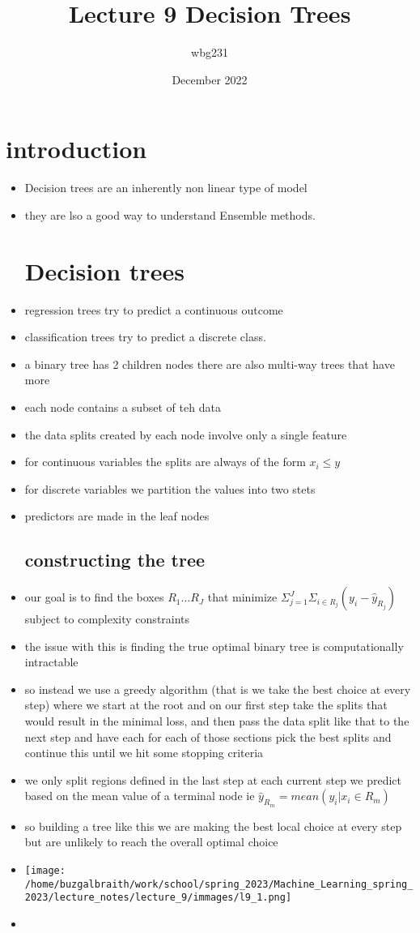 \documentclass{article}
\title{Lecture 9 Decision  Trees}
\author{wbg231 }
\date{December 2022}
\begin{document}
\maketitle

\section*{introduction}
\begin{itemize}
\item Decision trees are an inherently non linear type of model
\item they are lso a good way to understand Ensemble  methods. 
\section*{Decision trees}
\item regression trees try to predict a continuous outcome 
\item classification trees try to predict a discrete class.
\item a binary tree has 2 children nodes there are also multi-way trees that have more 
\item each node contains a subset of teh data 
\item the data splits created by each node involve only a single feature 
\item for continuous variables the splits are always of the form $x_{i}\leq y$
\item for discrete variables we partition the values into two stets 
\item predictors are made in the leaf nodes 
\subsection*{constructing the tree }
\item our goal is to find the boxes $R_1\dots R_J$ that minimize
 $\Sigma_{j=1}^{J}\Sigma_{i\in R_{j}}(y_i-\hat{y}_{R_{j}})$ subject to 
 complexity constraints 
\item the issue with this is finding the true optimal binary tree is computationally
intractable
\item so instead we use a greedy algorithm  (that is we take the best choice at every step)
where we start at the root and on our first step take the splits that would 
result in the minimal loss, and then pass the data split like that to the next
step and have each for each of those sections pick the best splits
and continue this until we hit some stopping criteria
\item we only split regions defined in the last step at each current step 
we predict based on the mean value of a terminal node ie $\hat{y}_{R_{m}}=mean(y_i|x_i\in R_{m})$ 
\item so building a tree like this we are making the best local choice at every step but are unlikely to reach the overall optimal choice
\item \texttt{[image: /home/buzgalbraith/work/school/spring\_2023/Machine\_Learning\_spring\_2023/lecture\_notes/lecture\_9/immages/l9\_1.png]}
\item 
\end{itemize}
\end{document}
